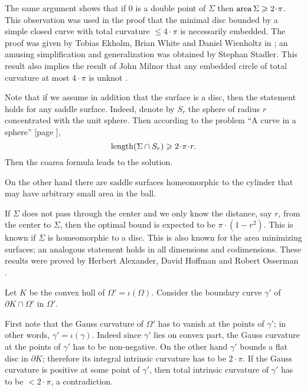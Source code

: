 The same argument shows that if $0$ is a double point
of $\Sigma$ then $\area\Sigma\ge 2\cdot \pi$.
This observation was used in the proof 
that the minimal disc bounded by a simple closed curve with total curvature $\le 4\cdot\pi$ 
is necessarily embedded.
The proof was given by 
Tobias Ekholm, 
Brian White
and Daniel Wienholtz
in \cite{EWW};
an amusing simplification and generalization
was obtained by 
Stephan Stadler. %
This result also implies the result of John Milnor that any embedded circle of total curvature at most $4\cdot\pi$ is unknot \cite[see][]{milnor}.

Note that if we assume in addition that the surface is a disc,
then the statement holds for any saddle surface. 
Indeed, denote by $S_r$ the sphere of radius $r$ concentrated with the unit sphere. 
Then according to the problem ``A curve in a sphere'' [page \pageref{A curve in a sphere}], 
\[\length(\Sigma\cap S_r)\ge 2\cdot\pi\cdot r.\]
Then the coarea formula leads to the solution.

On the other hand there are saddle surfaces homeomorphic to the cylinder
that may have arbitrary small area in the ball. 

If $\Sigma$ does not pass through the center 
and we only know the distance, say $r$, 
from the center to $\Sigma$,
then the optimal bound is expected to be $\pi\cdot(1-r^2)$.
This is known if $\Sigma$ is homeomorphic to a disc.
This is also known for the area minimizing surfaces;
an analogous statement
holds in all dimensions and codimensions.
These results were proved by 
Herbert Alexander, 
David Hoffman
and Robert Osserman \cite[see][]{alexander-osserman,alexander-hoffman-osserman}.






Let $K$ be the convex hull of $\Omega'=\iota(\Omega)$.
Consider the boundary curve $\gamma'$ of $\partial K\cap \Omega'$ in $\Omega'$.

First note that the Gauss curvature of $\Omega'$ has to vanish at the points of $\gamma'$;
in other words, $\gamma'=\iota(\gamma)$.
Indeed since $\gamma'$ lies on convex part, 
the Gauss curvature at the points of $\gamma'$ has to be non-negative. 
On the other hand $\gamma'$ bounds a flat disc in $\partial K$;
therefore its integral intrinsic curvature has to be $2{\cdot}\pi$.
If the Gauss curvature is positive at some point of $\gamma'$, 
then total intrinsic curvature of $\gamma'$ has to be $<2{\cdot}\pi$, a contradiction.

